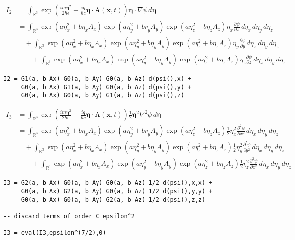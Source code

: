 \begin{align*}
I_2&=\int_{\mathbb R^3}
\exp\left(\frac{im\boldsymbol\eta^2}{2\hbar\epsilon}
-\frac{iq}{\hbar c}\boldsymbol\eta\cdot\mathbf A(\mathbf x,t)\right)
\boldsymbol\eta\cdot\nabla\psi
\,d\boldsymbol\eta
\\
&=\int_{\mathbb R^3}
\exp\left(a\eta_x^2+b\eta_xA_x\right)
\exp\left(a\eta_y^2+b\eta_yA_y\right)
\exp\left(a\eta_z^2+b\eta_zA_z\right)\eta_x\frac{\partial\psi}{\partial x}
\,d\eta_x\,d\eta_y\,d\eta_z
\\
&\quad{}+\int_{\mathbb R^3}
\exp\left(a\eta_x^2+b\eta_xA_x\right)
\exp\left(a\eta_y^2+b\eta_yA_y\right)
\exp\left(a\eta_z^2+b\eta_zA_z\right)\eta_y\frac{\partial\psi}{\partial y}
\,d\eta_x\,d\eta_y\,d\eta_z
\\
&\quad\quad{}+\int_{\mathbb R^3}
\exp\left(a\eta_x^2+b\eta_xA_x\right)
\exp\left(a\eta_y^2+b\eta_yA_y\right)
\exp\left(a\eta_z^2+b\eta_zA_z\right)\eta_z\frac{\partial\psi}{\partial z}
\,d\eta_x\,d\eta_y\,d\eta_z
\end{align*}

{\footnotesize\begin{verbatim}
I2 = G1(a, b Ax) G0(a, b Ay) G0(a, b Az) d(psi(),x) +
     G0(a, b Ax) G1(a, b Ay) G0(a, b Az) d(psi(),y) +
     G0(a, b Ax) G0(a, b Ay) G1(a, b Az) d(psi(),z)
\end{verbatim}}

\begin{align*}
I_3&=\int_{\mathbb R^3}
\exp\left(\frac{im\boldsymbol\eta^2}{2\hbar\epsilon}
-\frac{iq}{\hbar c}\boldsymbol\eta\cdot\mathbf A(\mathbf x,t)\right)
\tfrac{1}{2}\boldsymbol\eta^2\nabla^2\psi
\,d\boldsymbol\eta
\\
&=\int_{\mathbb R^3}
\exp\left(a\eta_x^2+b\eta_xA_x\right)
\exp\left(a\eta_y^2+b\eta_yA_y\right)
\exp\left(a\eta_z^2+b\eta_zA_z\right)
\tfrac{1}{2}\eta_x^2\frac{\partial^2\psi}{\partial x^2}
\,d\eta_x\,d\eta_y\,d\eta_z
\\
&\quad{}+\int_{\mathbb R^3}
\exp\left(a\eta_x^2+b\eta_xA_x\right)
\exp\left(a\eta_y^2+b\eta_yA_y\right)
\exp\left(a\eta_z^2+b\eta_zA_z\right)
\tfrac{1}{2}\eta_y^2\frac{\partial^2\psi}{\partial y^2}
\,d\eta_x\,d\eta_y\,d\eta_z
\\
&\quad\quad{}+\int_{\mathbb R^3}
\exp\left(a\eta_x^2+b\eta_xA_x\right)
\exp\left(a\eta_y^2+b\eta_yA_y\right)
\exp\left(a\eta_z^2+b\eta_zA_z\right)
\tfrac{1}{2}\eta_z^2\frac{\partial^2\psi}{\partial z^2}
\,d\eta_x\,d\eta_y\,d\eta_z
\end{align*}

{\footnotesize\begin{verbatim}
I3 = G2(a, b Ax) G0(a, b Ay) G0(a, b Az) 1/2 d(psi(),x,x) +
     G0(a, b Ax) G2(a, b Ay) G0(a, b Az) 1/2 d(psi(),y,y) +
     G0(a, b Ax) G0(a, b Ay) G2(a, b Az) 1/2 d(psi(),z,z)

-- discard terms of order C epsilon^2

I3 = eval(I3,epsilon^(7/2),0)
\end{verbatim}}


